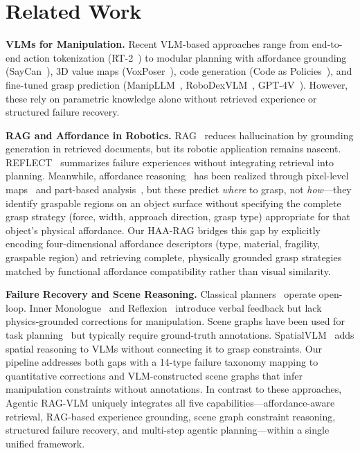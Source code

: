 \documentclass[letterpaper, 10pt, conference]{ieeeconf}
\newcommand{\sysname}{Agentic RAG-VLM}
\newcommand{\haarag}{HAA-RAG}
\begin{document}
\section{Related Work}
\label{sec:related}

\textbf{VLMs for Manipulation.}
Recent VLM-based approaches range from end-to-end action tokenization (RT-2~\cite{brohan2023rt2}) to modular planning with affordance grounding (SayCan~\cite{ahn2022saycan}), 3D value maps (VoxPoser~\cite{huang2023voxposer}), code generation (Code as Policies~\cite{liang2023code}), and fine-tuned grasp prediction (ManipLLM~\cite{li2024manipllm}, RoboDexVLM~\cite{liu2025robodexvlm}, GPT-4V~\cite{wake2023gpt4v}).
However, these rely on parametric knowledge alone without retrieved experience or structured failure recovery.

\textbf{RAG and Affordance in Robotics.}
RAG~\cite{lewis2020rag} reduces hallucination by grounding generation in retrieved documents, but its robotic application remains nascent.
REFLECT~\cite{liu2023reflect} summarizes failure experiences without integrating retrieval into planning.
Meanwhile, affordance reasoning~\cite{gibson1977affordance} has been realized through pixel-level maps~\cite{mandikal2021dexvip} and part-based analysis~\cite{mo2021where2act}, but these predict \emph{where} to grasp, not \emph{how}---they identify graspable regions on an object surface without specifying the complete grasp strategy (force, width, approach direction, grasp type) appropriate for that object's physical affordance.
Our \haarag{} bridges this gap by explicitly encoding four-dimensional affordance descriptors (type, material, fragility, graspable region) and retrieving complete, physically grounded grasp strategies matched by functional affordance compatibility rather than visual similarity.

\textbf{Failure Recovery and Scene Reasoning.}
Classical planners~\cite{kumra2020grconvnet, fang2023anygrasp, sundermeyer2021contact} operate open-loop.
Inner Monologue~\cite{huang2022inner} and Reflexion~\cite{shinn2023reflexion} introduce verbal feedback but lack physics-grounded corrections for manipulation.
Scene graphs have been used for task planning~\cite{zeng2020transporter} but typically require ground-truth annotations.
SpatialVLM~\cite{kwon2024spatialvlm} adds spatial reasoning to VLMs without connecting it to grasp constraints.
Our pipeline addresses both gaps with a 14-type failure taxonomy mapping to quantitative corrections and VLM-constructed scene graphs that infer manipulation constraints without annotations.
In contrast to these approaches, \sysname{} uniquely integrates all five capabilities---affordance-aware retrieval, RAG-based experience grounding, scene graph constraint reasoning, structured failure recovery, and multi-step agentic planning---within a single unified framework.
\end{document}
